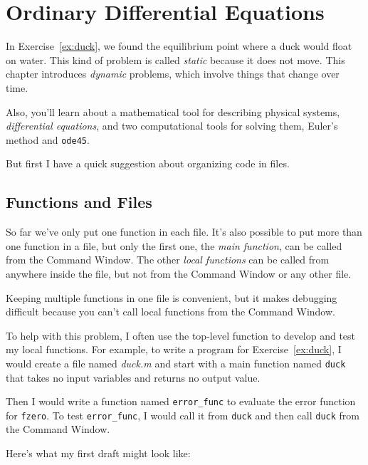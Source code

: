 \chapter{Ordinary Differential Equations}


In Exercise~\ref{ex:duck}, we found the equilibrium point where a duck would float on water.  This kind of problem is called \emph{static} because it does not move.  This chapter introduces \emph{dynamic} problems, which involve things that change over time.

Also, you'll learn about a mathematical tool for describing physical systems, \emph{differential equations}, and two computational tools for solving them, Euler's method and \lstinline{ode45}.

But first I have a quick suggestion about organizing code in files.

\section{Functions and Files}
\label{funfiles}

So far we've only put one function in each file.  It's also possible
to put more than one function in a file, but only the first one, the
\emph{main function}, can be called from the Command
Window.  The other \emph{local functions} can be called from anywhere inside the file, but not from the Command Window or any other file.


Keeping multiple functions in one file is convenient, but it makes  debugging
difficult because you can't call local functions from the Command
Window.

To help with this problem, I often use the top-level function
to develop and test my local functions.  For example, to write
a program for Exercise~\ref{ex:duck}, I would create a file named
\emph{duck.m} and start with a main function named \lstinline{duck}
that takes no input variables and returns no output value.

Then I would write a function named \lstinline{error_func} to
evaluate the error function for \lstinline{fzero}.  To test
\lstinline{error_func}, I would call it from \lstinline{duck} and then
call \lstinline{duck} from the Command Window.


Here's what my first draft might look like:

